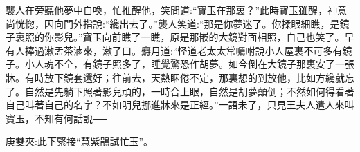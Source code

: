 \begin{parag}
    襲人在旁聽他夢中自喚，忙推醒他，笑問道:“寶玉在那裏？”此時寶玉雖醒，神意尚恍惚，因向門外指說:“纔出去了。”襲人笑道:“那是你夢迷了。你揉眼細瞧，是鏡子裏照的你影兒。”寶玉向前瞧了一瞧，原是那嵌的大鏡對面相照，自己也笑了。早有人捧過漱盂茶滷來，漱了口。麝月道:“怪道老太太常囑咐說小人屋裏不可多有鏡子。小人魂不全，有鏡子照多了，睡覺驚恐作胡夢。如今倒在大鏡子那裏安了一張牀。有時放下鏡套還好；往前去，天熱睏倦不定，那裏想的到放他，比如方纔就忘了。自然是先躺下照著影兒頑的，一時合上眼，自然是胡夢顛倒；不然如何得看著自己叫著自己的名字？不如明兒挪進牀來是正經。”一語未了，只見王夫人遣人來叫寶玉，不知有何話說──\begin{note}庚雙夾:此下緊接“慧紫鵑試忙玉”。\end{note}
\end{parag}
